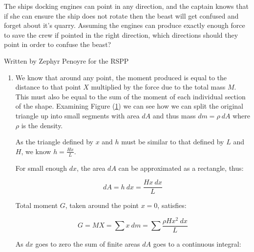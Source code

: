 \begin{problem}
{\begin{enumerate}
{	The ships docking engines can point in any direction, and the captain knows that if she can ensure the ship does not rotate then the beast will get confused and forget about it's quarry. Assuming the engines can produce exactly enough force to save the crew if pointed in the right direction, which directions should they point in order to confuse the beast?}
	
\end{enumerate}
}
{Written by Zephyr Penoyre for the RSPP}
{\answer[a]{}
\answer[b]{}
\answer[c]{}
\answer[d]{}
\answer[e]{}
\begin{enumerate}
\begin{figure}[h]
	\centering
	\texttt{[image: Statics\_spaceship\_triangle]}S
	\caption{}
	\label{fig:Statics_spaceship_triangle}
\end{figure}

	\item We know that around any point, the moment produced is equal to the distance to that point $X$ multiplied by the force due to the total mass $M$. This must also be equal to the sum of the moment of each individual section of the shape. Examining Figure (\ref{fig:Statics_spaceship_triangle}) we can see how we can split the original triangle up into small segments with area $d{A}$ and thus mass $dm =\rho~ d{A}$ where $\rho$ is the density.
	
	As the triangle defined by $x$ and $h$ must be similar to that defined by $L$ and $H$, we know $h = \frac{Hx}{L}$.
	
	For small enough $d{x}$, the area $d{A}$ can be approximated as a rectangle, thus:
	
	\begin{equation}	d{A} = h~d{x} = \frac{H x~d{x}}{L}  \end{equation}
	
	Total moment $G$, taken around the point $x=0$, satisfies:
	
	\begin{equation}	G = M X = \sum{x~dm} = \sum{\frac{\rho H x^{2} ~dx}{L}}  \end{equation}
	
	As $dx$ goes to zero the sum of finite areas $dA$ goes to a continuous integral:
	

\end{enumerate}}
\end{problem}
